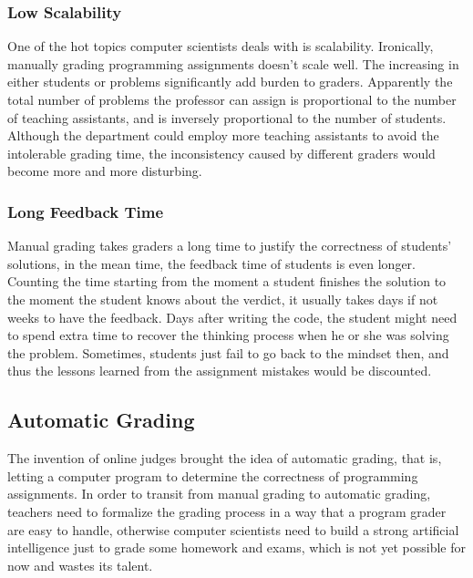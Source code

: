         \subsubsection{Low Scalability}

            One of the hot topics computer scientists deals with is scalability.
            Ironically, manually grading programming assignments doesn't scale well.
            The increasing in either students or problems significantly add burden to graders.
            Apparently the total number of problems the professor can assign is proportional to
            the number of teaching assistants, and is inversely proportional to the number of students.
            Although the department could employ more teaching assistants to avoid the intolerable grading time,
            the inconsistency caused by different graders would become more and more disturbing.

        \subsubsection{Long Feedback Time}

            Manual grading takes graders a long time to justify the correctness of students' solutions,
            in the mean time, the feedback time of students is even longer.
            Counting the time starting from the moment a student finishes the solution to the moment
            the student knows about the verdict, it usually takes days if not weeks to have the feedback.
            Days after writing the code, the student might need to spend extra time to recover
            the thinking process when he or she was solving the problem.
            Sometimes, students just fail to go back to the mindset then, and thus the lessons learned from
            the assignment mistakes would be discounted.

    \subsection{Automatic Grading}

        The invention of online judges brought the idea of automatic grading, that is,
        letting a computer program to determine the correctness of programming assignments.
        In order to transit from manual grading to automatic grading,
        teachers need to formalize the grading process in a way that a program grader are easy to handle,
        otherwise computer scientists need to build a strong artificial intelligence
        just to grade some homework and exams, which is not yet possible for now and wastes its talent.

